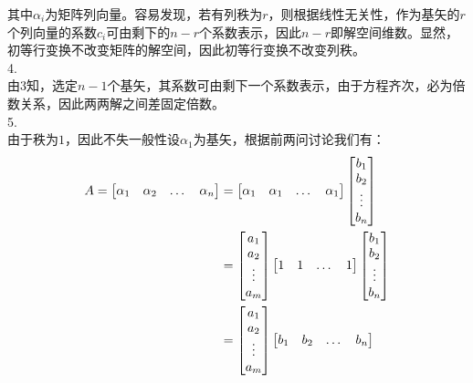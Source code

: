\documentclass[utf8]{ctexart}
\begin{document}
其中$\alpha_i$为矩阵列向量。容易发现，若有列秩为$r$，则根据线性无关性，作为基矢的$r$个列向量的系数$c_i$可由剩下的$n-r$个系数表示，因此$n-r$即解空间维数。显然，初等行变换不改变矩阵的解空间，因此初等行变换不改变列秩。\\
4.\\
由3知，选定$n-1$个基矢，其系数可由剩下一个系数表示，由于方程齐次，必为倍数关系，因此两两解之间差固定倍数。\\
5.\\
由于秩为$1$，因此不失一般性设$\alpha_1$为基矢，根据前两问讨论我们有：
\begin{align}
	A=\begin{bmatrix}
		\alpha_1&\alpha_2&\dots&\alpha_n
	\end{bmatrix}
	&=\begin{bmatrix}
		\alpha_1&\alpha_1&\dots&\alpha_1
	\end{bmatrix}
	\begin{bmatrix}
		b_1\\
		b_2\\
		\vdots\\
		b_n
	\end{bmatrix}\notag\\
	&=\begin{bmatrix}
		a_1\\
		a_2\\
		\vdots\\
		a_m
	\end{bmatrix}
	\begin{bmatrix}
		1&1&\dots&1
	\end{bmatrix}
	\begin{bmatrix}
		b_1\\
		b_2\\
		\vdots\\
		b_n
	\end{bmatrix}\notag\\
	&=\begin{bmatrix}
		a_1\\
		a_2\\
		\vdots\\
		a_m
	\end{bmatrix}
	\begin{bmatrix}
		b_1&b_2&\dots&b_n
	\end{bmatrix}\notag
\end{align}
\end{document}
